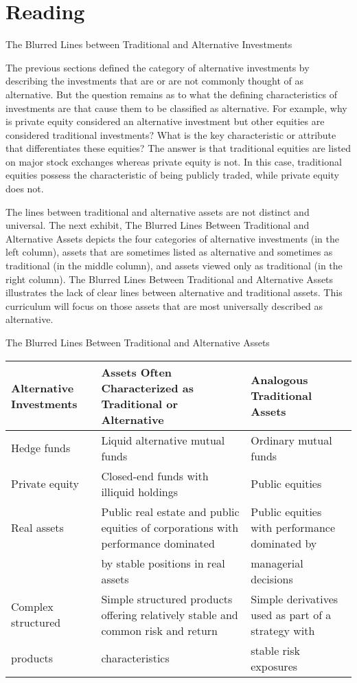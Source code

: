 \documentclass[11pt]{article}
\begin{document}
\section*{Reading}
The Blurred Lines between Traditional and Alternative Investments

The previous sections defined the category of alternative investments by describing the investments that are or are not commonly thought of as alternative. But the question remains as to what the defining characteristics of investments are that cause them to be classified as alternative. For example, why is private equity considered an alternative investment but other equities are considered traditional investments? What is the key characteristic or attribute that differentiates these equities? The answer is that traditional equities are listed on major stock exchanges whereas private equity is not. In this case, traditional equities possess the characteristic of being publicly traded, while private equity does not.

The lines between traditional and alternative assets are not distinct and universal. The next exhibit, The Blurred Lines Between Traditional and Alternative Assets depicts the four categories of alternative investments (in the left column), assets that are sometimes listed as alternative and sometimes as traditional (in the middle column), and assets viewed only as traditional (in the right column). The Blurred Lines Between Traditional and Alternative Assets illustrates the lack of clear lines between alternative and traditional assets. This curriculum will focus on those assets that are most universally described as alternative.

The Blurred Lines Between Traditional and Alternative Assets

\begin{center}
\begin{tabular}{|lll|}
\hline
Alternative Investments & Assets Often Characterized as Traditional or Alternative & Analogous Traditional Assets \\
\hline
Hedge funds & Liquid alternative mutual funds & Ordinary mutual funds \\
Private equity & Closed-end funds with illiquid holdings & Public equities \\
Real assets & Public real estate and public equities of corporations with performance dominated & Public equities with performance dominated by \\
 & by stable positions in real assets & managerial decisions \\
Complex structured & Simple structured products offering relatively stable and common risk and return & Simple derivatives used as part of a strategy with \\
products & characteristics & stable risk exposures \\
\hline
\end{tabular}
\end{center}
\end{document}
